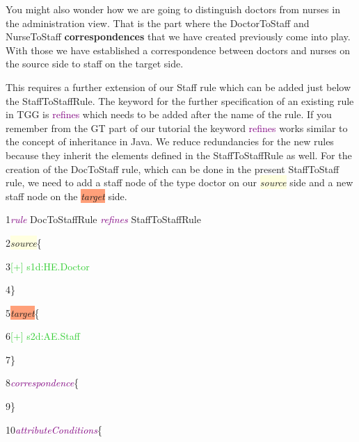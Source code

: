 {You might also wonder how we are going to distinguish doctors from nurses in the administration view. That is the part where the \textsf{DoctorToStaff} and \textsf{NurseToStaff} \textbf{correspondences} that we have created previously come into play. With those we have established a correspondence between doctors and nurses on the source side to staff on the target side.

This requires a further extension of our Staff rule which can be added just below the \textsf{StaffToStaffRule}. The keyword for the further specification of an existing rule in TGG is \textcolor{Purple}{refines} which needs to be added after the name of the rule. If you remember from the GT part of our tutorial the keyword \textcolor{Purple}{refines} works similar to the concept of inheritance in Java. We reduce redundancies for the new rules because they inherit the elements defined in the \textsf{StaffToStaffRule} as well.
For the creation of the DocToStaff rule, which can be done in the present StaffToStaff rule, we need to add a staff node of the type doctor on our \colorbox{LightYellow}{\textit{source}} side and a new staff node on the \colorbox{LightSalmon}{\textit{target}} side. \newline

{

1\hspace{0.5cm}\textcolor{Purple}{\textit{rule}} DocToStaffRule \textcolor{Purple}{\textit{refines}} StaffToStaffRule

2\hspace{0.5cm}\colorbox{LightYellow}{\textit{source}}\{

3\hspace{1cm}\textcolor{LimeGreen}{[+] s1d:HE.Doctor}

4\hspace{0.5cm}\}

5\hspace{0.5cm}\colorbox{LightSalmon}{\textit{target}}\{

6\hspace{1cm}\textcolor{LimeGreen}{[+] s2d:AE.Staff}

7\hspace{0.5cm}\}

8\hspace{0.5cm}\textcolor{Purple}{\textit{correspondence}}\{

9\hspace{0.5cm}\}

10\hspace{0.42cm}\textcolor{Purple}{\textit{attributeConditions}}\{

}}
